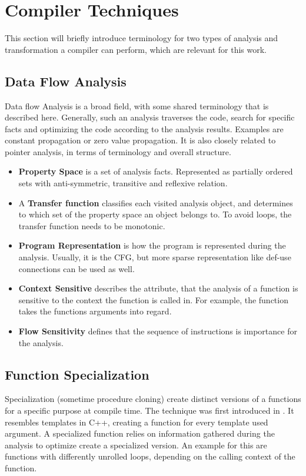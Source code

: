 \section{Compiler Techniques}
This section will briefly introduce terminology for two types of analysis and transformation a compiler can perform, which are relevant
for this work.
\subsection{Data Flow Analysis}
Data flow Analysis is a broad field, with some shared terminology that is described here. Generally, such an analysis traverses the code,
search for specific facts and optimizing the code according to the analysis results. Examples are constant propagation or zero value propagation. It is also closely related to pointer analysis, in terms of terminology and overall structure.
\begin{itemize}
	\item \textbf{Property Space} is a set of analysis facts. Represented as partially ordered sets with anti-symmetric, transitive and reflexive relation.\cite{Rastello:2016:SCD:3002539}
	\item A \textbf{Transfer function} classifies each visited analysis object, and determines to which set of the property space an object belongs to. To avoid loops, the transfer function needs to be monotonic. \cite{Rastello:2016:SCD:3002539}
	\item \textbf{Program Representation} is how the program is represented during the analysis. Usually, it is the CFG, but more sparse representation like def-use connections can be used as well. \cite{Rastello:2016:SCD:3002539}
	\item \textbf{Context Sensitive} describes the attribute, that the analysis of a function is sensitive to the context the function is called in. For example, the function
	takes the functions arguments into regard. \cite{Emami:1994:CIP:178243.178264}
	\item \textbf{Flow Sensitivity} defines that the sequence of instructions is importance for the analysis. \cite{Hardekopf:2009:SFP:1480881.1480911}
\end{itemize}

\subsection{Function Specialization}
Specialization (sometime procedure cloning) create distinct versions of a functions for a specific purpose at compile time. The technique was first introduced in \cite{Cooper:1993:MPC:2245763.2246020}. It resembles templates in C++, creating a function for every template used argument. A specialized function relies on information gathered during the analysis to optimize create a specialized version. An example for this are functions with differently unrolled loops, depending on the calling context of the function.

